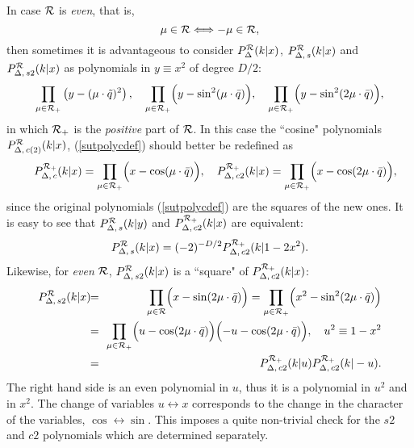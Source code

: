\documentclass[a4paper,12pt]{article}
\begin{document}
In case ${\cal R}$ is {\em even\/}, that is,
\begin{equation}
   \mu\in{\cal R}\Longleftrightarrow -\mu\in{\cal R},
\end{equation}
then sometimes it is advantageous to consider
$P_{\Delta}^{\cal R}(k|x)$, $P_{\Delta,\, s}^{\cal R}(k|x)$ and
$P_{\Delta,\, s2}^{\cal R}(k|x)$ as polynomials in $y\equiv x^2$ of
degree $D/2$:
\begin{equation}
   \prod_{\mu\in{\cal R_+}}\left(y-(\mu\cdot\tilde{q})^2\right), \quad
   \prod_{\mu\in{\cal R_+}}\Bigl(y-\sin^2(\mu\cdot\bar{q})\Bigr),
   \quad \prod_{\mu\in{\cal R_+}}\Bigl(y-\sin^2(2\mu\cdot\bar{q})\Bigr),
   \label{evenpol}
\end{equation}
in which ${\cal R}_+$ is the {\em positive\/} part of ${\cal R}$.
In this case the ``cosine" polynomials $P_{\Delta,\, c(2)}^{\cal R}(k|x)$,
(\ref{sutpolycdef}) should better be redefined as
\begin{eqnarray}
   &&P_{\Delta,\, c}^{\cal R_+}(k|x)=
   \prod_{\mu\in{\cal R}_+}\Bigl(x-\cos(\mu\cdot\bar{q})\Bigr),\quad
   P_{\Delta,\, c2}^{\cal R_+}(k|x)=
   \prod_{\mu\in{\cal R}_+}\Bigl(x-\cos(2\mu\cdot\bar{q})\Bigr),
   \label{sutpolycdefplus}
\end{eqnarray}
since the original polynomials (\ref{sutpolycdef}) are the squares of
the new ones. It is easy to see that $P_{\Delta,\, s}^{\cal R}(k|y)$ and
$P_{\Delta,\, c2}^{\cal R_+}(k|x)$ are equivalent:
\begin{equation}
   P_{\Delta,\, s}^{\cal R}(k|x)=(-2)^{-D/2}
   P_{\Delta,\, c2}^{\cal R_+}(k|1-2x^2).
   \label{sc2rel}
\end{equation}
Likewise, for {\em even\/} ${\cal R}$, $P_{\Delta,\, s2}^{\cal R}(k|x)$
is a ``square" of  $P_{\Delta,\, c2}^{{\cal R}_+}(k|x)$:
\begin{eqnarray}
   P_{\Delta,\, s2}^{\cal R}(k|x)&\!\!=\!\!&
   \prod_{\mu\in{\cal R}}\Bigl(x-\sin(2\mu\cdot\bar{q})\Bigr)
   =\prod_{\mu\in{{\cal R}_+}}\Bigl(x^2-\sin^2(2\mu\cdot\bar{q})\Bigr)
   \nonumber\\
%
   &\!\!=\!\!&
   \prod_{\mu\in{{\cal R}_+}}\Bigl(u-\cos(2\mu\cdot\bar{q})\Bigr)
   \Bigl(-u-\cos(2\mu\cdot\bar{q})\Bigr),
   \quad u^2\equiv 1-x^2\nonumber\\
%
   &\!\!=\!\!&
   P_{\Delta,\, c2}^{{\cal R}_+}(k|u)P_{\Delta,\, c2}^{{\cal R}_+}(k|-u).
   \label{s2c2rel}
\end{eqnarray}
The right hand side is an even polynomial in $u$, thus it is a polynomial
in $u^2$ and in $x^2$.
The change of variables $u\leftrightarrow x$ corresponds to the change
in the character of the variables, $\cos \leftrightarrow \sin$.
This imposes a quite non-trivial check for the $s2$
and $c2$ polynomials which are determined separately.
\end{document}

